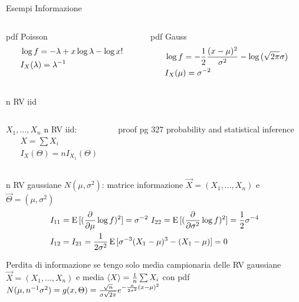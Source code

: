 \begin{wordonframe}{Esempi Informazione}
\begin{columns}[T]
\begin{column}{0.5\textwidth}
\begin{block}{pdf Poisson}
\begin{align*}
&\log{f}=-\lambda+x\log{\lambda}-\log{x!}\\
&I_X(\lambda)={\lambda}^{-1}
\end{align*}
\end{block}
\end{column}
\begin{column}{0.5\textwidth}
\begin{block}{pdf Gauss}
\begin{align*}
&\log{f}=-\frac{1}{2}\frac{(x-\mu)^2}{\sigma^2}-\log{(\sqrt{2\pi}\sigma)}\\
&I_X(\mu)=\sigma^{-2}
\end{align*}
\end{block}
\end{column}
\end{columns}
\begin{block}{n RV iid}
\begin{columns}[T]
\begin{column}{0.5\textwidth}
$X_1,\ldots,X_n$ n RV iid:
\begin{align*}
&X=\sum X_i\\
&I_X(\Theta)=nI_{X_1}(\Theta)
\end{align*}
\end{column}
\begin{column}{0.5\textwidth}
proof pg 327 probability and statistical inference
\end{column}
\end{columns}
\end{block}
\begin{block}{n RV gaussiane $N(\mu,\sigma^2)$: matrice informazione}
$\vec{X}=(X_1,\ldots,X_n)$ e $\vec{\Theta}=(\mu,\sigma^2)$
\begin{align*}
&I_{11}=\E{[(\PDof{\mu}\log{f})^2]}=\sigma\expy{-2}\ I_{22}=\E{[(\PDof{\sigma^2}\log{f})^2]}=\frac{1}{2}\sigma\expy{-4}\\
&I_{12}=I_{21}=\frac{1}{2\sigma^2}\E{[\sigma\expy{-3}(X_1-\mu)^3-(X_1-\mu)]}=0
\end{align*}
\end{block}
\begin{block}{Perdita di informazione se tengo solo media campionaria delle RV gaussiane}
$\vec{X}=(X_1,\ldots,X_n)$ e media $\langle X \rangle=\frac{1}{n}\sum X_i$ con pdf $N(\mu,{n}^{-1}\sigma^2)=g(x,\Theta)=\frac{\sqrt{n}}{\sigma\sqrt{2\pi}}e^{-\frac{n}{2\sigma^2}(x-\mu)^2}$

\end{block}
\end{wordonframe}
